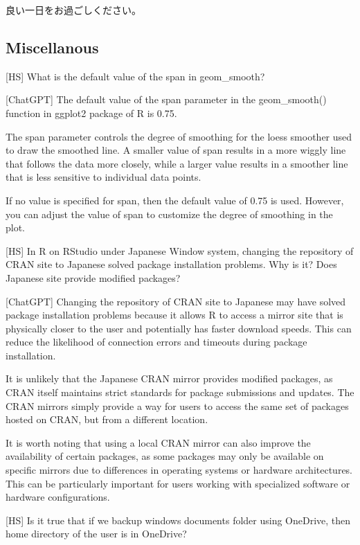 \documentclass[
]{bxjsbook}
\theoremstyle{definition}
\theoremstyle{definition}
\theoremstyle{definition}
\theoremstyle{definition}
\theoremstyle{remark}
\begin{document}
良い一日をお過ごしください。

\hypertarget{miscellanous}{%
\subsection{Miscellanous}\label{miscellanous}}

{[}HS{]} What is the default value of the span in geom\_smooth?

{[}ChatGPT{]} The default value of the span parameter in the geom\_smooth() function in ggplot2 package of R is 0.75.

The span parameter controls the degree of smoothing for the loess smoother used to draw the smoothed line. A smaller value of span results in a more wiggly line that follows the data more closely, while a larger value results in a smoother line that is less sensitive to individual data points.

If no value is specified for span, then the default value of 0.75 is used. However, you can adjust the value of span to customize the degree of smoothing in the plot.

{[}HS{]} In R on RStudio under Japanese Window system, changing the repository of CRAN site to Japanese solved package installation problems. Why is it? Does Japanese site provide modified packages?

{[}ChatGPT{]} Changing the repository of CRAN site to Japanese may have solved package installation problems because it allows R to access a mirror site that is physically closer to the user and potentially has faster download speeds. This can reduce the likelihood of connection errors and timeouts during package installation.

It is unlikely that the Japanese CRAN mirror provides modified packages, as CRAN itself maintains strict standards for package submissions and updates. The CRAN mirrors simply provide a way for users to access the same set of packages hosted on CRAN, but from a different location.

It is worth noting that using a local CRAN mirror can also improve the availability of certain packages, as some packages may only be available on specific mirrors due to differences in operating systems or hardware architectures. This can be particularly important for users working with specialized software or hardware configurations.

{[}HS{]} Is it true that if we backup windows documents folder using OneDrive, then home directory of the user is in OneDrive?
\end{document}
